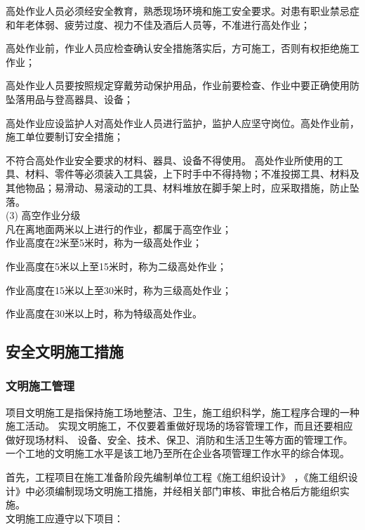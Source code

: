  高处作业人员必须经安全教育，熟悉现场环境和施工安全要求。对患有职业禁忌症和年老体弱、疲劳过度、视力不佳及酒后人员等，不准进行高处作业；

 高处作业前，作业人员应检查确认安全措施落实后，方可施工，否则有权拒绝施工作业；

 高处作业人员要按照规定穿戴劳动保护用品，作业前要检查、作业中要正确使用防坠落用品与登高器具、设备； 

 高处作业应设监护人对高处作业人员进行监护，监护人应坚守岗位。高处作业前，施工单位要制订安全措施；

 不符合高处作业安全要求的材料、器具、设备不得使用。
高处作业所使用的工具、材料、零件等必须装入工具袋，上下时手中不得持物；不准投掷工具、材料及其他物品；易滑动、易滚动的工具、材料堆放在脚手架上时，应采取措施，防止坠落。\\

(3) 高空作业分级\\

凡在离地面两米以上进行的作业，都属于高空作业；\\

 作业高度在2米至5米时，称为一级高处作业；

 作业高度在5米以上至15米时，称为二级高处作业；

 作业高度在15米以上至30米时，称为三级高处作业；

 作业高度在30米以上时，称为特级高处作业。\\

\subsection{安全文明施工措施}
\subsubsection{文明施工管理}

项目文明施工是指保持施工场地整洁、卫生，施工组织科学，施工程序合理的一种施工活动。
实现文明施工，不仅要着重做好现场的场容管理工作，而且还要相应做好现场材料、
设备、安全、技术、保卫、消防和生活卫生等方面的管理工作。
一个工地的文明施工水平是该工地乃至所在企业各项管理工作水平的综合体现。

首先，工程项目在施工准备阶段先编制单位工程《施工组织设计》
，《施工组织设计》中必须编制现场文明施工措施，并经相关部门审核、审批合格后方能组织实施。\\

文明施工应遵守以下项目：

